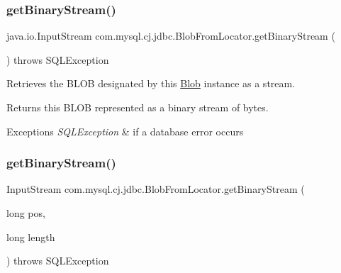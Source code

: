 \mbox{\label{classcom_1_1mysql_1_1cj_1_1jdbc_1_1_blob_from_locator_a4729992908a7cc12876aaaef51f7ce8e}} 
\subsubsection{\texorpdfstring{get\+Binary\+Stream()}{getBinaryStream()}\hspace{0.1cm}{\footnotesize\ttfamily [1/2]}}
{\footnotesize\ttfamily java.\+io.\+Input\+Stream com.\+mysql.\+cj.\+jdbc.\+Blob\+From\+Locator.\+get\+Binary\+Stream (\begin{DoxyParamCaption}{ }\end{DoxyParamCaption}) throws S\+Q\+L\+Exception}

Retrieves the B\+L\+OB designated by this \mbox{\hyperlink{classcom_1_1mysql_1_1cj_1_1jdbc_1_1_blob}{Blob}} instance as a stream.

\begin{DoxyReturn}{Returns}
this B\+L\+OB represented as a binary stream of bytes.
\end{DoxyReturn}

\begin{DoxyExceptions}{Exceptions}
{\em S\+Q\+L\+Exception} & if a database error occurs \\
\hline
\end{DoxyExceptions}
\mbox{\label{classcom_1_1mysql_1_1cj_1_1jdbc_1_1_blob_from_locator_aa77f948ff1858ec329525385e63e4e46}} 
\subsubsection{\texorpdfstring{get\+Binary\+Stream()}{getBinaryStream()}\hspace{0.1cm}{\footnotesize\ttfamily [2/2]}}
{\footnotesize\ttfamily Input\+Stream com.\+mysql.\+cj.\+jdbc.\+Blob\+From\+Locator.\+get\+Binary\+Stream (\begin{DoxyParamCaption}\item[{long}]{pos,  }\item[{long}]{length }\end{DoxyParamCaption}) throws S\+Q\+L\+Exception}

